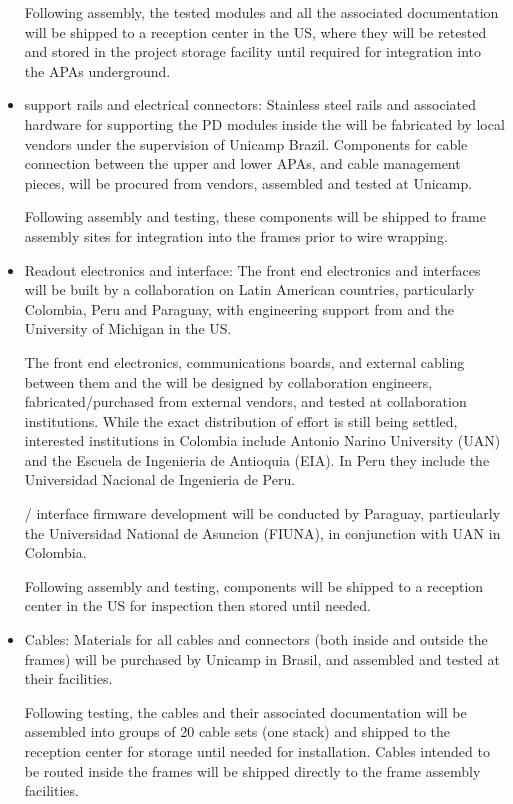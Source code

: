\begin{itemize}
Following assembly, the tested modules and all the associated  documentation will be shipped to a reception center in the US, where they will be retested and stored in the project storage facility until required for integration into the APAs underground.

\item {} support rails and electrical connectors:  Stainless steel rails and associated hardware for supporting the PD modules inside the  will be fabricated by local vendors under the supervision of Unicamp Brazil.  Components for cable connection between the upper and lower APAs, and cable management pieces, will be procured from vendors, assembled and tested at Unicamp.  

Following assembly and testing, these components will be shipped to  frame assembly sites for integration into the frames prior to wire wrapping.

\item Readout electronics and  interface:  The front end electronics and  interfaces will be built by a collaboration on Latin American countries, particularly Colombia, Peru and Paraguay, with engineering support from  and the University of Michigan in the US. 

The front end electronics, communications boards, and external cabling between them and the  will be designed by collaboration engineers, fabricated/purchased from external vendors, and tested at collaboration institutions.  While the exact distribution of effort is still being settled, interested institutions in Colombia include Antonio Narino University (UAN) and the Escuela de Ingenieria de Antioquia (EIA).  In Peru they include the Universidad Nacional de Ingenieria de Peru.

/ interface firmware development will be conducted by Paraguay, particularly the Universidad National de Asuncion (FIUNA), in conjunction with UAN in Colombia.

Following assembly and testing, components will be shipped to a reception center in the US for inspection then stored until needed.

\item Cables:  Materials for all cables and connectors (both inside and outside the  frames) will be purchased by Unicamp in Brasil, and assembled and tested at their facilities.

Following testing, the cables and their associated  documentation will be assembled into groups of 20 cable sets (one  stack) and shipped to the reception center for storage until needed for installation.  Cables intended to be routed inside the  frames will be shipped directly to the  frame assembly facilities.


\end{itemize}
